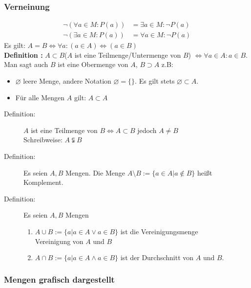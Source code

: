 \subsubsection{Verneinung}
\begin{align*}
\neg (\forall a \in M : P(a)) &= \exists a \in M : \neg P(a)\\
\neg (\exists a \in M: P(a)) &= \forall a \in M: \neg P(a)
\end{align*}
Es gilt: $A=B\Leftrightarrow\forall a: (a \in A) \Leftrightarrow (a \in B)$\\
\textbf{Definition :} $A \subset B$(\glqq $A$ ist eine Teilmenge/Untermenge von $B$\grqq) $\Leftrightarrow \forall a \in A: a \in B$. Man sagt auch $B$ ist eine Obermenge von $A$, $B \supset A$ z.B:
\begin{itemize}
\item $\varnothing$ leere Menge, andere Notation $\varnothing = \{\}$. Es gilt stets $\varnothing \subset A$.
\item Für alle Mengen $A$ gilt: $A\subset A$
\end{itemize}
\begin{description}
\item[Definition:] $A$ ist eine Teilmenge von $B \Leftrightarrow A \subset B$ jedoch $A \neq B$\\Schreibweise: $A \subsetneqq B$
\item[Definition:] Es seien $A,B$ Mengen. Die Menge $A \setminus B := \{a\in A | a \notin B\}$ heißt Komplement.
\item[Definition:] Es seien $A,B$ Mengen
	\begin{enumerate}
		\item $A \cup B := \{a|a\in A \vee a \in B \}$ ist die Vereinigungsmenge\\ Vereinigung von $A$ und $B$
		\item $A \cap B := \{a|a\in A \wedge a \in B \}$ ist der Durchschnitt von $A$ und $B$.
	\end{enumerate} 
\end{description}
\subsubsection{Mengen grafisch dargestellt}
\def\firstcircle{(0,0) circle (1.5cm)}
\def\secondcircle{(0:2cm) circle (1.5cm)}



